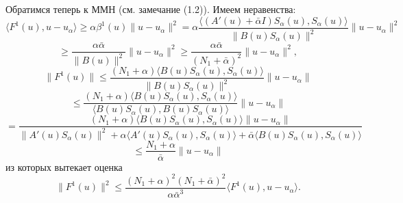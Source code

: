 Обратимся теперь к ММН (см. замечание (1.2)). Имеем неравенства:
$$\langle F^1(u), u-u_\alpha\rangle\ge\alpha\beta^1(u)\|u-u_\alpha\|^2= \alpha\frac{\langle (A'(u)+\bar\alpha I)S_\alpha (u),S_\alpha (u)\rangle }{\|B(u)S_\alpha (u)\|^2}\|u-u_\alpha\|^2$$
\begin{equation}\label{ineq3.11}
\ge\frac{\alpha\bar\alpha}{\|B(u)\|^2}\|u-u_\alpha\|^2\ge\frac{\alpha\bar\alpha}{(N_1+\bar\alpha)^2}\|u-u_\alpha\|^2,
\end{equation}
$$\|F^1(u)\|\le\frac{(N_1+\alpha)\langle B(u)S_\alpha (u),S_\alpha (u)\rangle }{\|B(u)S_\alpha (u)\|^2}\|u-u_\alpha\|$$
$$\le\frac{(N_1+\alpha)\langle B(u)S_\alpha (u),S_\alpha (u)\rangle }{\langle B(u)S_\alpha (u), B(u)S_\alpha (u)\rangle }\|u-u_\alpha\|$$ 
$$=\frac{(N_1+\alpha)\langle B(u)S_\alpha (u),S_\alpha (u)\rangle \|u-u_\alpha\|}{\|A'(u)S_\alpha (u)\|^2+\alpha\langle A'(u)S_\alpha (u),S_\alpha (u)\rangle +\bar\alpha\langle B(u)S_\alpha (u), S_\alpha (u)\rangle }$$
\begin{equation}\label{ineq3.12}
\le\frac{N_1+\alpha}{\bar\alpha}\|u-u_\alpha\|
\end{equation}
из которых вытекает оценка
$$\|F^1(u)\|^2\le\frac{(N_1+\alpha)^2(N_1+\bar\alpha)^2}{\alpha\bar\alpha^3}\langle F^1(u), u-u_\alpha\rangle.$$

